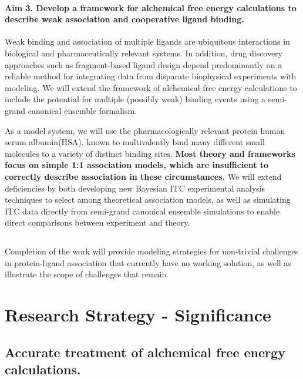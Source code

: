 \documentclass[10pt,final]{article}
\newif\ifinstr
\newcommand{\instr}[1]{\ifdraft{\ifinstr {\color{cyan}\emph{#1}} \fi}{}}
\begin{document}
\paragraph*{Aim 3. Develop a framework for alchemical free energy calculations to describe weak association and cooperative ligand binding.}
Weak binding and association of multiple ligands are ubiquitous interactions in biological and pharmaceutically relevant systems.
%
In addition, drug discovery approaches such as fragment-based ligand design depend predominantly on a reliable method for integrating data from disparate biophysical experiments with modeling.
%
We will extend the framework of alchemical free energy calculations  to include the potential for multiple (possibly weak) binding events using a semi-grand canonical ensemble formalism.
%

As a model system, we will use the pharmacologically relevant protein human serum albumin(HSA), known to multivalently bind many different small molecules to a variety of distinct binding sites.
%
\textbf{Most theory and frameworks focus on simple 1:1 association models, which are insufficient to correctly describe association in these circumstances.}
%
We will extend deficiencies by both developing new Bayesian ITC experimental analysis techniques to select among theoretical association models,
%
as well as simulating ITC data directly from semi-grand canonical ensemble simulations to enable direct comparisons between experiment and theory.

\subsection*{} %

Completion of the work will provide modeling strategies for non-trivial challenges in protein-ligand association that currently have no working solution, as well as illustrate the scope of challenges that remain.

\section*{Research Strategy - Significance}
\instr{General background, significance in terms of basic science and disease relevance.}

\subsection*{Accurate treatment of alchemical free energy calculations.}
\end{document}
